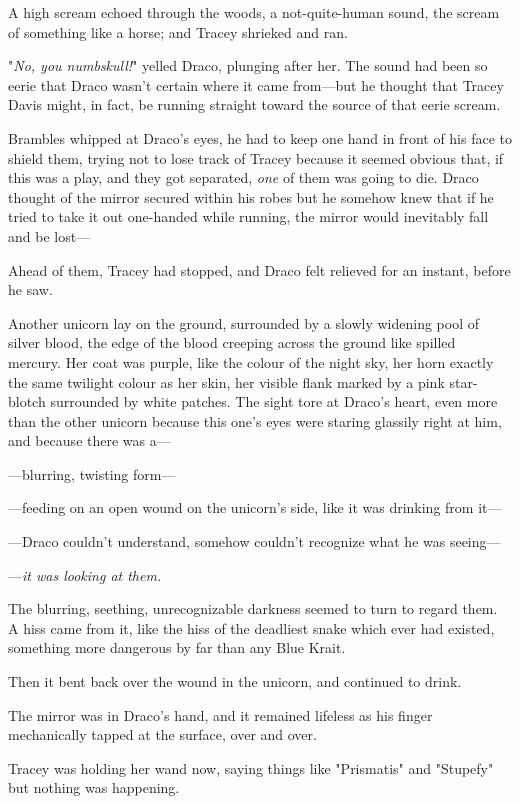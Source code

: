 A high scream echoed through the woods, a not-quite-human sound, the scream of
something like a horse; and Tracey shrieked and ran.

"\emph{No, you numbskull!}" yelled Draco, plunging after her. The sound had
been so eerie that Draco wasn't certain where it came from---but he thought
that Tracey Davis might, in fact, be running straight toward the source of that
eerie scream.

Brambles whipped at Draco's eyes, he had to keep one hand in front of his face
to shield them, trying not to lose track of Tracey because it seemed obvious
that, if this was a play, and they got separated, \emph{one} of them was going
to die. Draco thought of the mirror secured within his robes but he somehow
knew that if he tried to take it out one-handed while running, the mirror would
inevitably fall and be lost---

Ahead of them, Tracey had stopped, and Draco felt relieved for an instant,
before he saw.

Another unicorn lay on the ground, surrounded by a slowly widening pool of
silver blood, the edge of the blood creeping across the ground like spilled
mercury. Her coat was purple, like the colour of the night sky, her horn exactly
the same twilight colour as her skin, her visible flank marked by a pink
star-blotch surrounded by white patches. The sight tore at Draco's heart, even
more than the other unicorn because this one's eyes were staring glassily right
at him, and because there was a---

---blurring, twisting form---

---feeding on an open wound on the unicorn's side, like it was drinking from
it---

---Draco couldn't understand, somehow couldn't recognize what he was seeing---

---\emph{it was looking at them.}

The blurring, seething, unrecognizable darkness seemed to turn to regard them.
A hiss came from it, like the hiss of the deadliest snake which ever had
existed, something more dangerous by far than any Blue Krait.

Then it bent back over the wound in the unicorn, and continued to drink.

The mirror was in Draco's hand, and it remained lifeless as his finger
mechanically tapped at the surface, over and over.

Tracey was holding her wand now, saying things like "Prismatis" and "Stupefy"
but nothing was happening.

